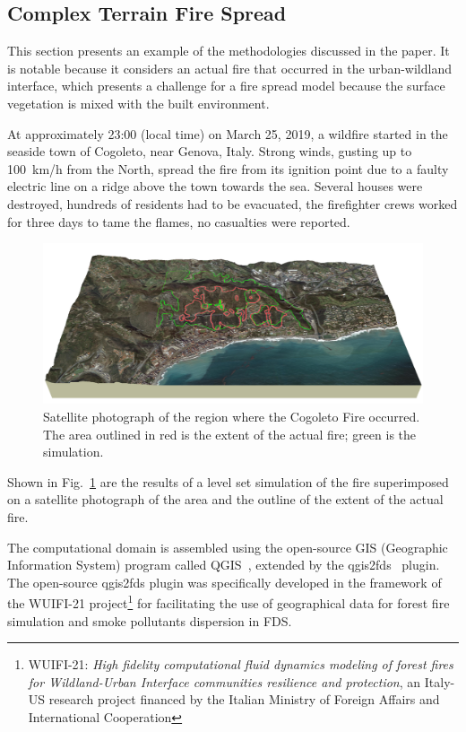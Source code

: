 \documentclass[journal,article,atmosphere,submit,moreauthors,pdftex]{Definitions/mdpi}
\begin{document}
\begin{table}[ht]
\begin{center}
\begin{tabular}{|l|c|c|c|}
\end{tabular}
\end{center}
\end{table}






\subsection{Complex Terrain Fire Spread}  
\label{sec:cogo}

This section presents an example of the methodologies discussed in the paper. It is notable because it considers an actual fire that occurred in the urban-wildland interface, which presents a challenge for a fire spread model because the surface vegetation is mixed with the built environment.

At approximately 23:00 (local time) on March 25, 2019, a wildfire started in the seaside town of Cogoleto, near Genova, Italy. Strong winds, gusting up to 100~km/h from the North, spread the fire from its ignition point due to a faulty electric line on a ridge above the town towards the sea. Several houses were destroyed, hundreds of residents had to be evacuated, the firefighter crews worked for three days to tame the flames, no casualties were reported.

\begin{figure}[ht]
\includegraphics[width=\textwidth]{figures/cogoleto_fire_2019_ls4_1000.png}
\caption{Satellite photograph of the region where the Cogoleto Fire occurred. The area outlined in red is the extent of the actual fire; green is the simulation.}
\label{Cogoleto_satellite}
\end{figure}

Shown in Fig.~\ref{Cogoleto_satellite} are the results of a level set simulation of the fire superimposed on a satellite photograph of the area and the outline of the extent of the actual fire.

The computational domain is assembled using the open-source GIS (Geographic Information System) program called QGIS~\cite{QGIS}, extended by the qgis2fds~\cite{qgis2fds} plugin. The open-source qgis2fds plugin was specifically developed in the framework of the WUIFI-21 project\footnote{WUIFI-21: {\it High fidelity computational fluid dynamics modeling of forest fires for Wildland-Urban Interface communities resilience and protection}, an Italy-US research project financed by the Italian Ministry of Foreign Affairs and International Cooperation} for facilitating the use of geographical data for forest fire simulation and smoke pollutants dispersion in FDS.
\end{document}
